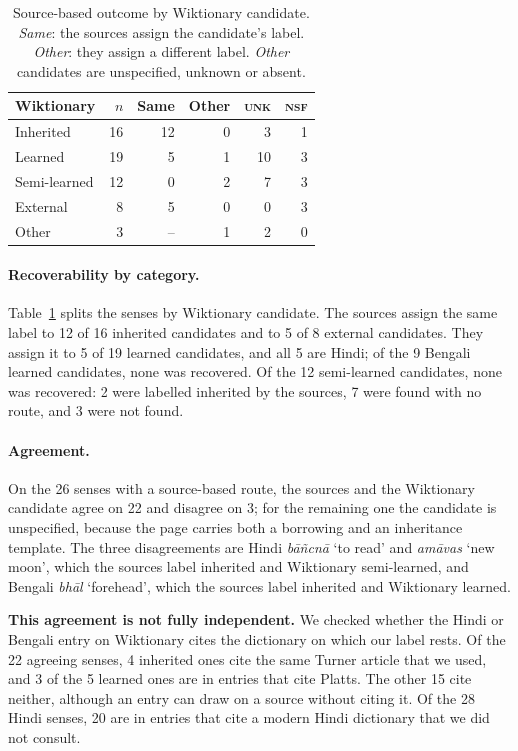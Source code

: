 \documentclass[11pt]{article}
\newcommand{\lbl}[1]{\textsc{#1}}
\newcommand{\gl}[1]{`#1'}
\begin{document}
\begin{table}[t]
\centering\small
\begin{tabular}{lrrrrr}
\toprule
\textbf{Wiktionary} & \textbf{$n$} & \textbf{Same} & \textbf{Other} & \textbf{\lbl{unk}} & \textbf{\lbl{nsf}} \\
\midrule
Inherited & 16 & 12 & 0 & 3 & 1 \\
Learned & 19 & 5 & 1 & 10 & 3 \\
Semi-learned & 12 & 0 & 2 & 7 & 3 \\
External & 8 & 5 & 0 & 0 & 3 \\
Other & 3 & -- & 1 & 2 & 0 \\
\bottomrule
\end{tabular}
\caption{Source-based outcome by Wiktionary candidate. \textit{Same}: the sources assign the candidate's label. \textit{Other}: they assign a different label. \textit{Other} candidates are unspecified, unknown or absent.}
\label{tab:recover}
\end{table}

\paragraph{Recoverability by category.} Table~\ref{tab:recover} splits the senses by Wiktionary candidate. The sources assign the same label to 12 of 16 inherited candidates and to 5 of 8 external candidates. They assign it to 5 of 19 learned candidates, and all 5 are Hindi; of the 9 Bengali learned candidates, none was recovered. Of the 12 semi-learned candidates, none was recovered: 2 were labelled inherited by the sources, 7 were found with no route, and 3 were not found.

\paragraph{Agreement.} On the 26 senses with a source-based route, the sources and the Wiktionary candidate agree on 22 and disagree on 3; for the remaining one the candidate is unspecified, because the page carries both a borrowing and an inheritance template. The three disagreements are Hindi \textit{b\=a\~ncn\=a} \gl{to read} and \textit{am\=avas} \gl{new moon}, which the sources label inherited and Wiktionary semi-learned, and Bengali \textit{bh\=al} \gl{forehead}, which the sources label inherited and Wiktionary learned.

\textbf{This agreement is not fully independent.} We checked whether the Hindi or Bengali entry on Wiktionary cites the dictionary on which our label rests. Of the 22 agreeing senses, 4 inherited ones cite the same Turner article that we used, and 3 of the 5 learned ones are in entries that cite Platts. The other 15 cite neither, although an entry can draw on a source without citing it. Of the 28 Hindi senses, 20 are in entries that cite a modern Hindi dictionary that we did not consult.
\end{document}
